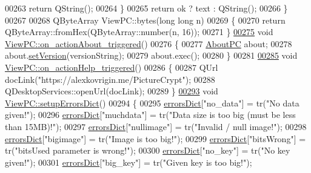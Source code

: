 \begin{DoxyCode}
00263         \textcolor{keywordflow}{return} QString();
00264     \}
00265     \textcolor{keywordflow}{return} ok ? text : QString();
00266 \}
00267 
00268 QByteArray ViewPC::bytes(\textcolor{keywordtype}{long} \textcolor{keywordtype}{long} n)
00269 \{
00270     \textcolor{keywordflow}{return} QByteArray::fromHex(QByteArray::number(n, 16));
00271 \}
\hypertarget{viewpc_8cpp_source.tex_l00275}{}\hyperlink{class_view_p_c_a09a46da4d492eb3dde88f35dc58c997b}{00275} \textcolor{keywordtype}{void} \hyperlink{class_view_p_c_a09a46da4d492eb3dde88f35dc58c997b}{ViewPC::on\_actionAbout\_triggered}()
00276 \{
00277     \hyperlink{class_about_p_c}{AboutPC} about;
00278     about.\hyperlink{class_about_p_c_aa3815d4826d0c8d87122449537a0a4d5}{setVersion}(versionString);
00279     about.exec();
00280 \}
00281 
\hypertarget{viewpc_8cpp_source.tex_l00285}{}\hyperlink{class_view_p_c_a0d252ff4829260c6c76769fbd24b7cd7}{00285} \textcolor{keywordtype}{void} \hyperlink{class_view_p_c_a0d252ff4829260c6c76769fbd24b7cd7}{ViewPC::on\_actionHelp\_triggered}()
00286 \{
00287     QUrl docLink(\textcolor{stringliteral}{"https://alexkovrigin.me/PictureCrypt"});
00288     QDesktopServices::openUrl(docLink);
00289 \}
\hypertarget{viewpc_8cpp_source.tex_l00293}{}\hyperlink{class_view_p_c_a89236a0bb8760f02e984b85a8571934c}{00293} \textcolor{keywordtype}{void} \hyperlink{class_view_p_c_a89236a0bb8760f02e984b85a8571934c}{ViewPC::setupErrorsDict}()
00294 \{
00295     \hyperlink{class_view_p_c_aaf7f058e5589d65fec72a21abfd5629b}{errorsDict}[\textcolor{stringliteral}{"no\_data"}] = tr(\textcolor{stringliteral}{"No data given!"});
00296     \hyperlink{class_view_p_c_aaf7f058e5589d65fec72a21abfd5629b}{errorsDict}[\textcolor{stringliteral}{"muchdata"}] = tr(\textcolor{stringliteral}{"Data size is too big (must be less than 15MB)!"});
00297     \hyperlink{class_view_p_c_aaf7f058e5589d65fec72a21abfd5629b}{errorsDict}[\textcolor{stringliteral}{"nullimage"}] = tr(\textcolor{stringliteral}{"Invalid / null image!"});
00298     \hyperlink{class_view_p_c_aaf7f058e5589d65fec72a21abfd5629b}{errorsDict}[\textcolor{stringliteral}{"bigimage"}] = tr(\textcolor{stringliteral}{"Image is too big!"});
00299     \hyperlink{class_view_p_c_aaf7f058e5589d65fec72a21abfd5629b}{errorsDict}[\textcolor{stringliteral}{"bitsWrong"}] = tr(\textcolor{stringliteral}{"bitsUsed parameter is wrong!"});
00300     \hyperlink{class_view_p_c_aaf7f058e5589d65fec72a21abfd5629b}{errorsDict}[\textcolor{stringliteral}{"no\_key"}] = tr(\textcolor{stringliteral}{"No key given!"});
00301     \hyperlink{class_view_p_c_aaf7f058e5589d65fec72a21abfd5629b}{errorsDict}[\textcolor{stringliteral}{"big\_key"}] = tr(\textcolor{stringliteral}{"Given key is too big!"});

\end{DoxyCode}

